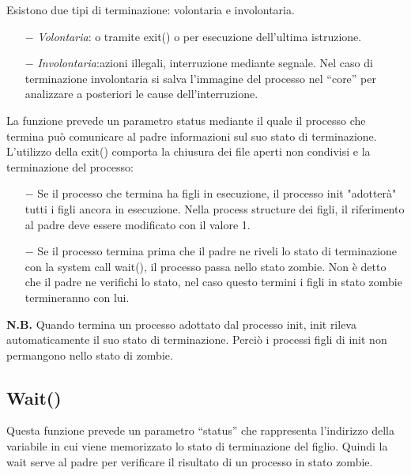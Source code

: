 \documentclass{article}
\begin{document}
\noindent Esistono due tipi di terminazione: volontaria e involontaria. 
\begin{itemize}
    \item[$-$] \textit{Volontaria}: o tramite exit() o per esecuzione dell'ultima 
    istruzione. 
    \item[$-$] \textit{Involontaria}:azioni illegali, interruzione mediante
    segnale. Nel caso di terminazione involontaria si salva l'immagine del
    processo nel “core” per analizzare a posteriori le cause dell'interruzione.
    
\end{itemize}
\noindent La funzione prevede un parametro status mediante il quale il processo
che termina può comunicare al padre informazioni sul suo stato di terminazione.
L'utilizzo della exit() comporta la chiusura dei file aperti non condivisi e 
la terminazione del processo:
\begin{itemize}
    \item[$-$] Se il processo che termina ha figli in esecuzione, 
    il processo init "adotterà" tutti i figli ancora in esecuzione.
    Nella process structure dei figli, il riferimento al padre deve essere 
    modificato con il valore 1.
    \item[$-$] Se il processo termina prima che il padre ne riveli lo stato
    di terminazione con la system call wait(), il processo passa nello stato
    zombie. Non è detto che il padre ne verifichi lo stato, nel caso questo 
    termini i figli in stato zombie termineranno con lui.
\end{itemize}

\noindent \textbf{N.B.} Quando termina un processo adottato dal processo init, init 
rileva automaticamente il suo stato di terminazione. Perciò i processi figli di
init non permangono nello stato di zombie.

\subsection{Wait()}

\noindent{}
\medskip

\noindent Questa funzione prevede un parametro “status” che rappresenta 
l'indirizzo della variabile in cui viene memorizzato lo stato di terminazione 
del figlio. Quindi la wait serve al padre per verificare il risultato di un 
processo in stato zombie.
\end{document}
